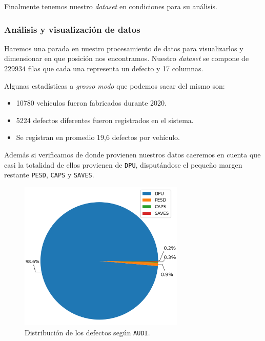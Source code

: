 \documentclass[a4paper,12pt]{article}
\begin{document}
Finalmente tenemos nuestro \textit{dataset} en condiciones para su análisis.

\subsubsection{Análisis y visualización de datos}

Haremos una parada en nuestro procesamiento de datos para visualizarlos y dimensionar en que posición nos encontramos.
Nuestro \textit{dataset} se compone de $229934$ filas que cada una representa un defecto y 17 columnas.

Algunas estadísticas a \textit{grosso modo} que podemos sacar del mismo son:

\begin{itemize}
	\item 10780 vehículos fueron fabricados durante 2020.
	\item 5224 defectos diferentes fueron registrados en el sistema.
	\item Se registran en promedio 19,6 defectos por vehículo.
\end{itemize}

Además si verificamos de donde provienen nuestros datos caeremos en cuenta que casi la totalidad de ellos provienen de \texttt{DPU}, disputándose el pequeño margen restante \texttt{PESD}, \texttt{CAPS} y \texttt{SAVES}.

\begin{figure}[H]
	\begin{center}				
	\includegraphics[width=0.7\textwidth]{audidist.png}
  	\caption{Distribución de los defectos según \texttt{AUDI}.}
  	\label{fig:distaudi}
  	\end{center}
\end{figure}
\end{document}
